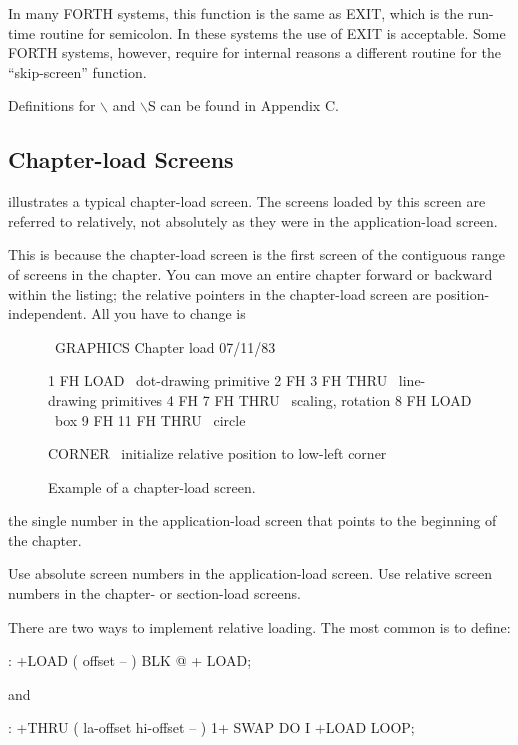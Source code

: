 In many FORTH systems, this function is the same as EXIT, which
is the run-time routine for semicolon.  In these systems the use of EXIT is
acceptable.  Some FORTH systems, however, require for internal reasons
a different routine for the ``skip-screen'' function.

Definitions for $\backslash${} and $\backslash${}S can be found in Appendix C.

\subsection{Chapter-load Screens}

 illustrates a typical chapter-load screen.  The screens loaded by
this screen are referred to relatively, not absolutely as they were in the
application-load screen.

This is because the chapter-load screen is the first screen of the contiguous
range of screens in the chapter.  You can move an entire chapter
forward or backward within the listing; the relative pointers in the
chapter-load screen are position-independent.  All you have to change is
\begin{figure*}
\caption{Example of a chapter-load screen.}

\setcounter{screen}{100}
\begin{Screen}
\ GRAPHICS                 Chapter load                 07/11/83

1 FH LOAD             \ dot-drawing primitive
2 FH 3 FH THRU        \ line-drawing primitives
4 FH 7 FH THRU        \ scaling, rotation
8 FH LOAD             \ box
9 FH 11 FH THRU       \ circle



CORNER  \ initialize relative position to low-left corner





\end{Screen}
\end{figure*}
the single number in the application-load screen that points to the beginning
of the chapter.

\begin{tip}
Use absolute screen numbers in the application-load screen.  Use relative
screen numbers in the chapter- or section-load screens.
\end{tip}
There are two ways to implement relative loading.  The most common is
to define:
\begin{Code}
: +LOAD  ( offset -- )  BLK @ +  LOAD;
\end{Code}
and
\begin{Code}
: +THRU  ( la-offset hi-offset -- )
     1+ SWAP DO  I +LOAD  LOOP;
\end{Code}


